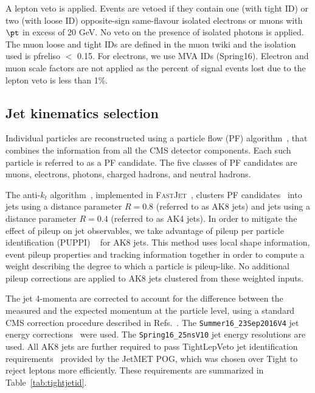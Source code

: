 A lepton veto is applied. Events are vetoed if they contain one (with tight ID) or two (with loose ID) opposite-sign same-flavour isolated electrons or muons with $\pt$ in excess of 20 GeV. No veto on the presence of isolated photons is applied. The muon loose and tight IDs are defined in the muon twiki and the isolation used is pfreliso $<$ 0.15. For electrons, we use MVA IDs (Spring16). Electron and muon scale factors are not applied as the percent of signal events lost due to the lepton veto is less than 1\%.

\subsection{Jet kinematics selection\label{ss:JetSel}}

Individual particles are reconstructed using a particle flow (PF) algorithm~\cite{PFPAS2009, CMS-PAS-PFT-10-001}, that combines the information from all the CMS detector components. Each such particle is referred to as a PF candidate. The five classes of PF candidates are  muons, electrons, photons, charged hadrons, and neutral hadrons. 

The anti-$k_{t}$ algorithm~\cite{antiKtAlgorithm}, implemented in \textsc{FastJet}~\cite{Cacciari:2011ma}, clusters PF candidates~\cite{PFPAS2009, CMS-PAS-PFT-10-001} into jets using a distance parameter $R = 0.8$ (referred to as AK8 jets) and jets using a distance parameter $R = 0.4$ (referred to as AK4 jets). 
In order to mitigate the effect of pileup on jet observables, we take advantage of pileup per particle identification (PUPPI) ~\cite{puppi} for AK8 jets. This method uses local shape information, event pileup properties and tracking information together in order to compute a weight describing the degree to which a particle is pileup-like. No additional pileup corrections are applied to AK8 jets clustered from these weighted inputs.

The jet 4-momenta are corrected to account for the difference between the measured and the expected momentum at the particle level, using a standard CMS correction procedure described in Refs.~\cite{JINST6,CMS-DP-2013-011}. The \texttt{Summer16\_23Sep2016V4} jet energy corrections~\cite{JESUncertaintyTWiki} were used. The \texttt{Spring16\_25nsV10} jet energy resolutions are used.  All AK8 jets are further required to pass TightLepVeto jet identification requirements~\cite{JetID13TeVTWiki} provided by the JetMET POG, which was chosen over Tight to reject leptons more efficiently. These requirements are summarized in Table~\ref{tab:tightjetid}.

